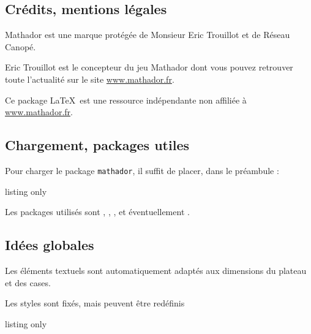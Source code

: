 \documentclass[11pt,a4paper]{ltxdoc}
\begin{document}
\subsection{Crédits, mentions légales}

\og \textsf{Mathador} est une marque protégée de Monsieur Eric Trouillot et de Réseau Canopé.

Eric Trouillot est le concepteur du jeu \textsf{Mathador} dont vous pouvez retrouver toute l’actualité sur le site \url{www.mathador.fr}.

Ce package \LaTeX\ est une ressource indépendante non affiliée à \url{www.mathador.fr}. \fg

\subsection{Chargement, packages utiles}

Pour charger le package \texttt{mathador}, il suffit de placer, dans le préambule :

\begin{DemoCode}{listing only}
\usepackage{mathador}
\usepackage[bm]{mathador}
\usepackage[nonbabel]{mathador}
\end{DemoCode}

Les packages utilisés sont , , ,  et éventuellement .

\subsection{Idées globales}

Les éléments textuels sont automatiquement adaptés aux dimensions du plateau et des cases.

Les styles sont fixés, mais peuvent être redéfinis

\begin{DemoCode}{listing only}
\end{DemoCode}
\end{document}
